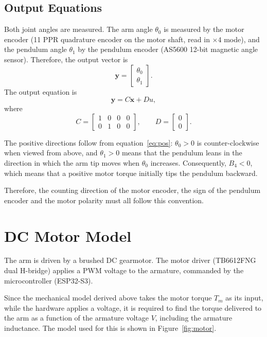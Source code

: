 \documentclass[a4paper,11pt]{article}
\begin{document}
\subsection{Output Equations}
Both joint angles are measured. The arm angle $\theta_0$ is measured by the motor encoder (11 PPR quadrature encoder on the motor shaft, read in $\times4$ mode), and the pendulum angle $\theta_1$ by the pendulum encoder (AS5600 12-bit magnetic angle sensor). Therefore, the output vector is
\begin{equation}
  \mathbf{y} = \begin{bmatrix} \theta_0 \\ \theta_1 \end{bmatrix}.
\end{equation}
The output equation is
\begin{equation}
  \mathbf{y} = C\mathbf{x} + Du ,
\end{equation}
where
\begin{equation}
  C = \begin{bmatrix} 1 & 0 & 0 & 0 \\ 0 & 1 & 0 & 0 \end{bmatrix}, \qquad
  D = \begin{bmatrix} 0 \\ 0 \end{bmatrix}.
\end{equation}

The positive directions follow from equation~\ref{eq:pos}: $\theta_0 > 0$ is counter-clockwise when viewed from above, and $\theta_1 > 0$ means that the pendulum leans in the direction in which the arm tip moves when $\theta_0$ increases. Consequently, $B_4 < 0$, which means that a positive motor torque initially tips the pendulum backward.

Therefore, the counting direction of the motor encoder, the sign of the pendulum encoder and the motor polarity must all follow this convention.

\section{DC Motor Model}
\label{sec:motor}
The arm is driven by a brushed DC gearmotor. The motor driver (TB6612FNG dual H-bridge) applies a PWM voltage to the armature, commanded by the microcontroller (ESP32-S3).

Since the mechanical model derived above takes the motor torque $T_m$ as its input, while the hardware applies a voltage, it is required to find the torque delivered to the arm as a function of the armature voltage $V$, including the armature inductance. The model used for this is shown in Figure~\ref{fig:motor}.
\end{document}
